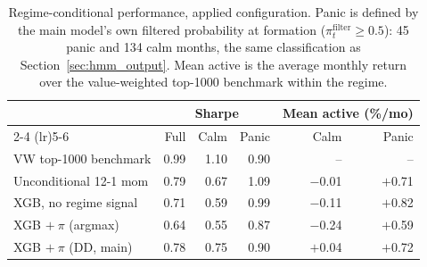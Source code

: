 \begin{table}[H]
\centering
\small
\begin{tabular}{l r r r r r}
\toprule
 & \multicolumn{3}{c}{Sharpe} & \multicolumn{2}{c}{Mean active (\%/mo)} \\
\cmidrule(lr){2-4} \cmidrule(lr){5-6}
 & Full & Calm & Panic & Calm & Panic \\
\midrule
VW top-1000 benchmark & 0.99 & 1.10 & 0.90 & -- & -- \\
\midrule
Unconditional 12-1 mom & 0.79 & 0.67 & 1.09 & $-$0.01 & $+$0.71 \\
XGB, no regime signal & 0.71 & 0.59 & 0.99 & $-$0.11 & $+$0.82 \\
XGB $+\ \pi$ (argmax) & 0.64 & 0.55 & 0.87 & $-$0.24 & $+$0.59 \\
XGB $+\ \pi$ (DD, main) & 0.78 & 0.75 & 0.90 & $+$0.04 & $+$0.72 \\
\bottomrule
\end{tabular}
\caption{Regime-conditional performance, applied configuration. Panic is defined by the main model's own filtered probability at formation ($\pi_t^{\text{filter}} \geq 0.5$): 45 panic and 134 calm months, the same classification as Section~\ref{sec:hmm_output}. Mean active is the average monthly return over the value-weighted top-1000 benchmark within the regime.}
\label{tab:regime_sharpe}
\end{table}
